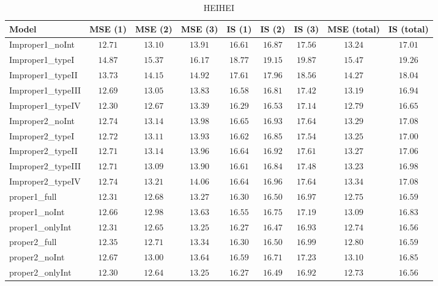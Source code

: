 \begin{table}

\caption{\label{tab:model-choice-sc10}HEIHEI}
\centering
\begin{tabular}{lcccccccc}
\hline
Model  & MSE (1) & MSE (2) & MSE (3) & IS (1) & IS (2) & IS (3) & MSE (total) & \multicolumn{1}{c}{IS (total)} \\ 
\hline
Improper1_noInt  & $12.71$ & $13.10$ & $13.91$ & $16.61$ & $16.87$ & $17.56$ & $13.24$ & $17.01$ \\
Improper1_typeI  & $14.87$ & $15.37$ & $16.17$ & $18.77$ & $19.15$ & $19.87$ & $15.47$ & $19.26$ \\
Improper1_typeII  & $13.73$ & $14.15$ & $14.92$ & $17.61$ & $17.96$ & $18.56$ & $14.27$ & $18.04$ \\
Improper1_typeIII  & $12.69$ & $13.05$ & $13.83$ & $16.58$ & $16.81$ & $17.42$ & $13.19$ & $16.94$ \\
Improper1_typeIV  & $12.30$ & $12.67$ & $13.39$ & $16.29$ & $16.53$ & $17.14$ & $12.79$ & $16.65$ \\
Improper2_noInt  & $12.74$ & $13.14$ & $13.98$ & $16.65$ & $16.93$ & $17.64$ & $13.29$ & $17.08$ \\
Improper2_typeI  & $12.72$ & $13.11$ & $13.93$ & $16.62$ & $16.85$ & $17.54$ & $13.25$ & $17.00$ \\
Improper2_typeII  & $12.71$ & $13.14$ & $13.96$ & $16.64$ & $16.92$ & $17.61$ & $13.27$ & $17.06$ \\
Improper2_typeIII  & $12.71$ & $13.09$ & $13.90$ & $16.61$ & $16.84$ & $17.48$ & $13.23$ & $16.98$ \\
Improper2_typeIV  & $12.74$ & $13.21$ & $14.06$ & $16.64$ & $16.96$ & $17.64$ & $13.34$ & $17.08$ \\
proper1_full  & $12.31$ & $12.68$ & $13.27$ & $16.30$ & $16.50$ & $16.97$ & $12.75$ & $16.59$ \\
proper1_noInt  & $12.66$ & $12.98$ & $13.63$ & $16.55$ & $16.75$ & $17.19$ & $13.09$ & $16.83$ \\
proper1_onlyInt  & $12.31$ & $12.65$ & $13.25$ & $16.27$ & $16.47$ & $16.93$ & $12.74$ & $16.56$ \\
proper2_full  & $12.35$ & $12.71$ & $13.34$ & $16.30$ & $16.50$ & $16.99$ & $12.80$ & $16.59$ \\
proper2_noInt  & $12.67$ & $13.00$ & $13.64$ & $16.59$ & $16.71$ & $17.23$ & $13.10$ & $16.85$ \\
proper2_onlyInt  & $12.30$ & $12.64$ & $13.25$ & $16.27$ & $16.49$ & $16.92$ & $12.73$ & $16.56$ \\
\hline 
\end{tabular}


\end{table}